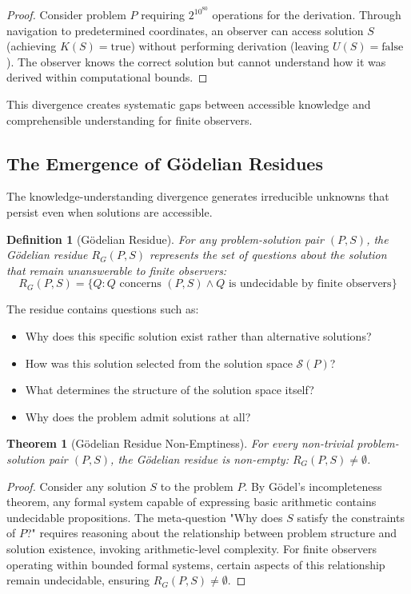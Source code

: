 \documentclass[12pt,a4paper]{article}
\newtheorem{theorem}{Theorem}
\newtheorem{definition}{Definition}
\begin{document}
\begin{proof}
Consider problem $P$ requiring $2^{10^{80}}$ operations for the derivation. Through navigation to predetermined coordinates, an observer can access solution $S$ (achieving $K(S) = \text{true}$) without performing derivation (leaving $U(S) = \text{false}$). The observer knows the correct solution but cannot understand how it was derived within computational bounds.
\end{proof}

This divergence creates systematic gaps between accessible knowledge and comprehensible understanding for finite observers.

\subsection{The Emergence of Gödelian Residues}

The knowledge-understanding divergence generates irreducible unknowns that persist even when solutions are accessible.

\begin{definition}[Gödelian Residue]
For any problem-solution pair $(P,S)$, the Gödelian residue $R_G(P,S)$ represents the set of questions about the solution that remain unanswerable to finite observers:
$$R_G(P,S) = \{Q : Q \text{ concerns } (P,S) \land Q \text{ is undecidable by finite observers}\}$$
\end{definition}

The residue contains questions such as:
\begin{itemize}
\item Why does this specific solution exist rather than alternative solutions?
\item How was this solution selected from the solution space $\mathcal{S}(P)$?
\item What determines the structure of the solution space itself?
\item Why does the problem admit solutions at all?
\end{itemize}

\begin{theorem}[Gödelian Residue Non-Emptiness]
For every non-trivial problem-solution pair $(P,S)$, the Gödelian residue is non-empty: $R_G(P,S) \neq \emptyset$.
\end{theorem}

\begin{proof}
Consider any solution $S$ to the problem $P$. By Gödel's incompleteness theorem, any formal system capable of expressing basic arithmetic contains undecidable propositions. The meta-question "Why does $S$ satisfy the constraints of $P$?" requires reasoning about the relationship between problem structure and solution existence, invoking arithmetic-level complexity. For finite observers operating within bounded formal systems, certain aspects of this relationship remain undecidable, ensuring $R_G(P,S) \neq \emptyset$.
\end{proof}
\end{document}
